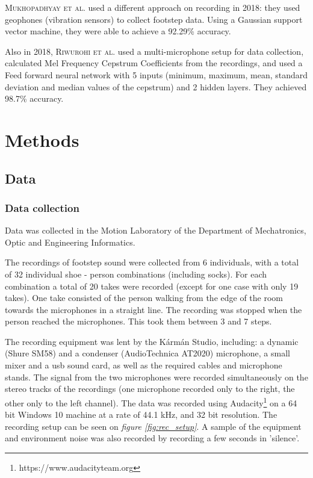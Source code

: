 \documentclass{article}
\begin{document}
\textsc{Mukhopadhyay et al.} used a different approach on recording in 2018: they used geophones (vibration sensors) to collect footstep data. Using a Gaussian support vector machine, they were able to achieve a 92.29\% accuracy.

Also in 2018, \textsc{Riwurohi et al.} used a multi-microphone setup for data collection, calculated Mel Frequency Cepstrum Coefficients from the recordings, and used a Feed forward neural network with 5 inputs (minimum, maximum, mean, standard deviation and median values of the cepstrum) and 2 hidden layers. They achieved 98.7\% accuracy.

\section{Methods}
\subsection{Data}
\subsubsection{Data collection}
Data was collected in the Motion Laboratory of the Department of Mechatronics, Optic and Engineering Informatics. 

The recordings of footstep sound were collected from 6 individuals, with a total of 32 individual shoe - person combinations (including socks). For each combination a total of 20 takes were recorded (except for one case with only 19 takes). One take consisted of the person walking from the edge of the room towards the microphones in a straight line. The recording was stopped when the person reached the microphones. This took them between 3 and 7 steps.

The recording equipment was lent by the Kármán Studio, including: a dynamic (Shure SM58) and a condenser (AudioTechnica AT2020)
microphone, a small mixer and a usb sound card, as well as the required cables and microphone stands. The signal from the two microphones were recorded simultaneously on the stereo tracks of the recordings (one microphone recorded only to the right, the other only to the left channel). The data was recorded using Audacity\footnote{https://www.audacityteam.org} on a 64 bit Windows 10 machine at a rate of 44.1 kHz, and 32 bit resolution. The recording setup can be seen on \textit{figure \ref{fig:rec_setup}}. A sample of the equipment and environment noise was also recorded by recording a few seconds in 'silence'.
\end{document}
